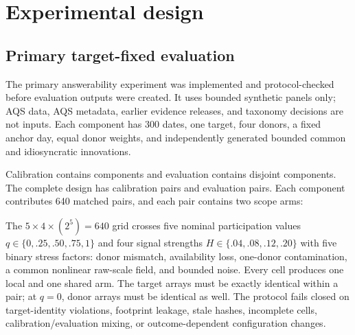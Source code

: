 \section{Experimental design}
\suppressfloats[t]
\label{sec:experimental-design}

\subsection{Primary target-fixed evaluation}

The primary answerability experiment was implemented and protocol-checked before
evaluation outputs were created. It uses bounded synthetic panels only; AQS
data, AQS metadata, earlier evidence releases, and taxonomy decisions are not
inputs. Each component has 300 dates, one target, four donors, a fixed anchor
day, equal donor weights, and independently generated bounded common and
idiosyncratic innovations.

Calibration contains \VFiveCalibrationComponents{} components and evaluation
contains \VFiveEvaluationComponents{} disjoint components. The complete design
has \VFiveCalibrationPairs{} calibration pairs and \VFiveEvaluationPairs{}
evaluation pairs. Each component contributes 640 matched pairs, and each pair
contains two scope arms:
\begin{center}
\end{center}

The $5\times4\times(2^5)=640$ grid crosses five nominal participation values
$q\in\{0,.25,.50,.75,1\}$ and four signal strengths
$H\in\{.04,.08,.12,.20\}$ with five binary stress factors: donor mismatch,
availability loss, one-donor contamination, a common nonlinear raw-scale
field, and bounded noise. Every cell produces one local and one shared arm.
The target arrays must be exactly identical within a pair; at $q=0$, donor
arrays must be identical as well. The protocol fails closed on target-identity
violations, footprint leakage, stale hashes, incomplete cells,
calibration/evaluation mixing, or outcome-dependent configuration changes.

